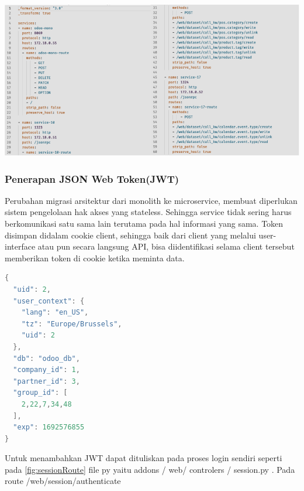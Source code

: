 \begin{center}
	\includegraphics[width=14cm]{img/bab_4/kong_yml.png}
	\label{fig:kong_yml}
\end{center}
 	
\subsubsection{Penerapan JSON Web  Token(JWT)}
Perubahan migrasi arsitektur dari monolith ke microservice, membuat diperlukan sistem pengelolaan hak akses yang stateless. Sehingga service tidak sering harus berkomunikasi satu sama lain terutama pada hal informasi yang sama. Token disimpan didalam cookie client, sehingga baik dari client yang melalui user-interface atau pun secara langsung API, bisa diidentifikasi selama client tersebut memberikan token di cookie ketika meminta data.

\begin{lstlisting}[style=mystyle, language=java, caption={Isi data berupa JSON di JWT}]
{
  "uid": 2,
  "user_context": {
    "lang": "en_US",
    "tz": "Europe/Brussels",
    "uid": 2
  },
  "db": "odoo_db",
  "company_id": 1,
  "partner_id": 3,
  "group_id": [
    2,22,7,34,48
  ],
  "exp": 1692576855
}
\end{lstlisting} 


Untuk menambahkan JWT dapat dituliskan pada proses login sendiri seperti pada \ref{fig:sessionRoute} file py yaitu addons / web/ controlers / session.py . Pada route  /web/session/authenticate 

